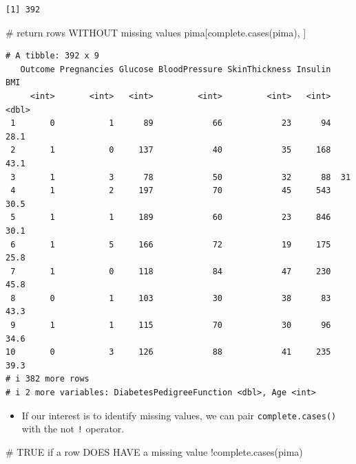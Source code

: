 \documentclass[
  letterpaper,
  DIV=11,
  numbers=noendperiod]{scrreprt}
\newenvironment{Shaded}{\begin{snugshade}}{\end{snugshade}}
\newcommand{\CommentTok}[1]{\textcolor[rgb]{0.37,0.37,0.37}{#1}}
\newcommand{\FunctionTok}[1]{\textcolor[rgb]{0.28,0.35,0.67}{#1}}
\newcommand{\NormalTok}[1]{\textcolor[rgb]{0.00,0.23,0.31}{#1}}
\newcommand{\SpecialCharTok}[1]{\textcolor[rgb]{0.37,0.37,0.37}{#1}}
\providecommand{\tightlist}{%
  \setlength{\itemsep}{0pt}\setlength{\parskip}{0pt}}\usepackage{longtable,booktabs,array}
\begin{document}
\begin{verbatim}
[1] 392
\end{verbatim}

\begin{Shaded}
\begin{Highlighting}[]
\CommentTok{\# return rows WITHOUT missing values}
\NormalTok{pima[}\FunctionTok{complete.cases}\NormalTok{(pima), ]  }
\end{Highlighting}
\end{Shaded}

\begin{verbatim}
# A tibble: 392 x 9
   Outcome Pregnancies Glucose BloodPressure SkinThickness Insulin   BMI
     <int>       <int>   <int>         <int>         <int>   <int> <dbl>
 1       0           1      89            66            23      94  28.1
 2       1           0     137            40            35     168  43.1
 3       1           3      78            50            32      88  31  
 4       1           2     197            70            45     543  30.5
 5       1           1     189            60            23     846  30.1
 6       1           5     166            72            19     175  25.8
 7       1           0     118            84            47     230  45.8
 8       0           1     103            30            38      83  43.3
 9       1           1     115            70            30      96  34.6
10       0           3     126            88            41     235  39.3
# i 382 more rows
# i 2 more variables: DiabetesPedigreeFunction <dbl>, Age <int>
\end{verbatim}

\begin{itemize}
\tightlist
\item
  If our interest is to identify missing values, we can pair
  \texttt{complete.cases()} with the not \texttt{!} operator.
\end{itemize}

\begin{Shaded}
\begin{Highlighting}[]
\CommentTok{\# TRUE if a row DOES HAVE a missing value}
\SpecialCharTok{!}\FunctionTok{complete.cases}\NormalTok{(pima)}
\end{Highlighting}
\end{Shaded}
\end{document}

